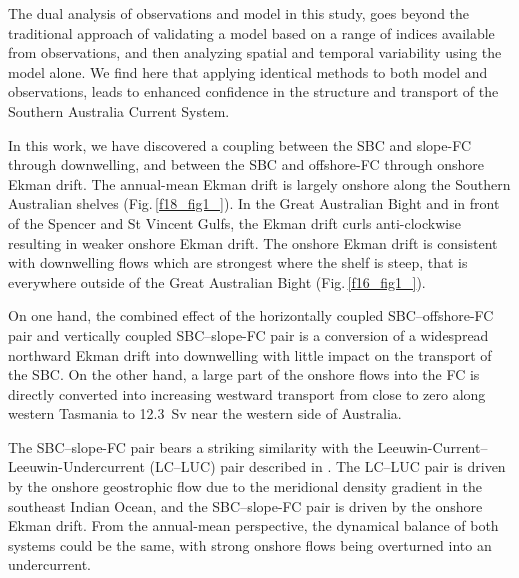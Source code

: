 \documentclass[preprint,3p,review,12pt]{elsarticle}
\begin{document}
The dual analysis of observations and model in this study, goes beyond the traditional approach of validating a model based on a range of indices available from observations, and then analyzing spatial and temporal variability using the model alone. We find here that applying identical methods to both model and observations, leads to enhanced confidence in the structure and transport of the Southern Australia Current System.

In this work, we have discovered a coupling between the SBC and slope-FC through downwelling, and between the SBC and offshore-FC through onshore Ekman drift. The annual-mean Ekman drift is largely onshore along the Southern Australian shelves (Fig.\,\ref{f18_fig1_}). In the Great Australian Bight and in front of the Spencer and St Vincent Gulfs, the Ekman drift curls anti-clockwise resulting in weaker onshore Ekman drift. The onshore Ekman drift is consistent with downwelling flows which are strongest where the shelf is steep, that is everywhere outside of the Great Australian Bight (Fig.\,\ref{f16_fig1_}).

On one hand, the combined effect of the horizontally coupled SBC--offshore-FC pair and vertically coupled SBC--slope-FC pair is a conversion of a widespread northward Ekman drift into downwelling with little impact on the transport of the SBC\@. On the other hand, a large part of the onshore flows into the FC is directly converted into increasing westward transport from close to zero along western Tasmania to \SI{12.3}{Sv} near the western side of Australia. 

The SBC--slope-FC pair bears a striking similarity with the Leeuwin-Current--Leeuwin-Undercurrent (LC--LUC) pair described in \citet{Furue2017}. The LC--LUC pair is driven by the onshore geostrophic flow due to the meridional density gradient in the southeast Indian Ocean, and the SBC--slope-FC pair is driven by the onshore Ekman drift. From the annual-mean perspective, the dynamical balance of both systems could be the same, with strong onshore flows being overturned into an undercurrent.
\end{document}

